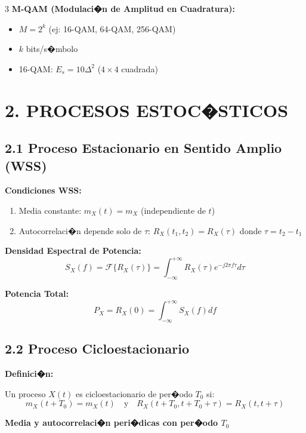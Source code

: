 ﻿\documentclass[8pt,a4paper]{article}
\begin{document}
\begin{multicols}{3}
\textbf{M-QAM (Modulaci�n de Amplitud en Cuadratura):}
\begin{itemize}[leftmargin=*,itemsep=0pt]
    \item $M = 2^k$ (ej: 16-QAM, 64-QAM, 256-QAM)
    \item $k$ bits/s�mbolo
    \item 16-QAM: $E_s = 10\Delta^2$ ($4\times4$ cuadrada)
\end{itemize}

\vspace{-2mm}
\section*{\color{sectioncolor}\normalsize 2. PROCESOS ESTOC�STICOS}
\vspace{-3mm}

\subsection*{\small 2.1 Proceso Estacionario en Sentido Amplio (WSS)}
\vspace{-2mm}

\textbf{Condiciones WSS:}
\begin{enumerate}[leftmargin=*,itemsep=0pt]
    \item Media constante: $m_X(t) = m_X$ (independiente de $t$)
    \item Autocorrelaci�n depende solo de $\tau$: $R_X(t_1, t_2) = R_X(\tau)$ donde $\tau = t_2 - t_1$
\end{enumerate}

\textbf{Densidad Espectral de Potencia:}
\[
S_X(f) = \mathcal{F}\{R_X(\tau)\} = \int_{-\infty}^{+\infty} R_X(\tau) e^{-j2\pi f\tau} d\tau
\]

\textbf{Potencia Total:}
\[
P_X = R_X(0) = \int_{-\infty}^{+\infty} S_X(f) df
\]

\vspace{-2mm}
\subsection*{\small 2.2 Proceso Cicloestacionario}
\vspace{-2mm}

\textbf{Definici�n:}

Un proceso $X(t)$ es cicloestacionario de per�odo $T_0$ si:
\[
m_X(t + T_0) = m_X(t) \quad \text{y} \quad R_X(t + T_0, t + T_0 + \tau) = R_X(t, t + \tau)
\]

\textbf{Media y autocorrelaci�n peri�dicas con per�odo $T_0$}


\end{multicols}
\end{document}
